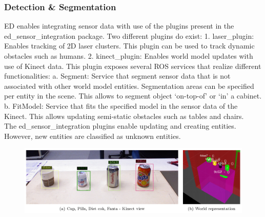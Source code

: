 \subsubsection{Detection \& Segmentation}
ED enables integrating sensor data with use of the plugins present in the ed\_sensor\_integration package. Two different plugins do exist:
1. laser\_plugin: Enables tracking of 2D laser clusters. This plugin can be used to track dynamic obstacles such as humans.
2. kinect\_plugin: Enables world model updates with use of Kinect data. This plugin exposes several ROS services that realize different functionalities:
a. Segment: Service that segment sensor data that is not associated with other world model entities. Segmentation areas can be specified per entity in the scene. This allows to segment object ‘on-top-of’ or ‘in’ a cabinet.
b. FitModel: Service that fits the specified model in the sensor data of the Kinect. This allows updating semi-static obstacles such as tables and chairs.
\\
The ed\_sensor\_integration plugins enable updating and creating entities. However, new entities are classified as unknown entities.
\begin{figure}[h]
    \centering
    \vspace{-0.3cm}
	\includegraphics[width = 0.9\linewidth]{Figures/ed_perception}
    \vspace{-1em}
    \caption{}
	\label{fig:ed_perception}
    \vspace{-0.5cm}
\end{figure}

